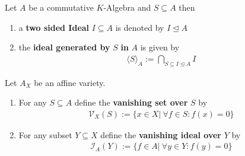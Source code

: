 \documentclass[]{article}
\begin{document}
\begin{definition*}[Ideal]
    Let \(A\) be a commutative \(K\)-Algebra and \(S \subseteq A\) then 
    \begin{enumerate}[label=\alph*)]
        \item a \textbf{two sided Ideal} \(I \subseteq A \) is denoted by \( I \trianglelefteq A\)
        \item  the \textbf{ideal generated by} \(S\) \textbf{in} \(A\) is given by
        \begin{align*}
            \langle S\rangle_A := \bigcap_{S \subseteq I \trianglelefteq A} I
        \end{align*}
    \end{enumerate}
\end{definition*}

\setcounter{theorem}{6}
\begin{definition}
    Let \(A_X\) be an affine variety. 
    \begin{enumerate}[label=\alph*)]
        \item For any \(S \subseteq A\) define the \textbf{vanishing set over} \(S\) by
        \begin{align*}
            \mathcal{V}_X(S) := \{x \in X \vert \ \forall f \in S: f(x)=0\}
        \end{align*}
        \item For any subset \(Y \subseteq X\) define the \textbf{vanishing ideal over} \(Y\) by 
        \begin{align*}
            \mathcal{I}_A(Y):= \{f \in A \vert \ \forall y \in Y: f(y) = 0\}
        \end{align*}
    \end{enumerate}
\end{definition}
\end{document}
